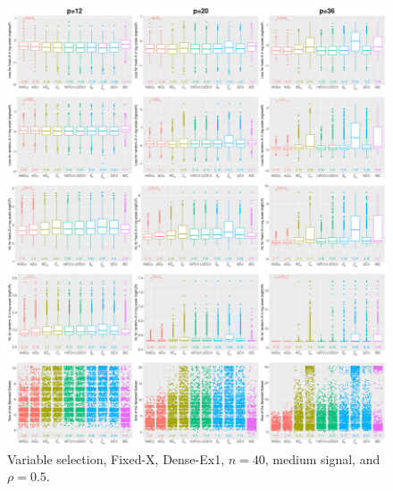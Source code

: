\begin{figure}[!ht]
\centering
\includegraphics[width=\textwidth]{figures/supplement/fixedx/subset_selection/Dense-Ex1_n40_msnr_rho05.eps}
\caption{Variable selection, Fixed-X, Dense-Ex1, $n=40$, medium signal, and $\rho=0.5$.}
\end{figure}
\clearpage
